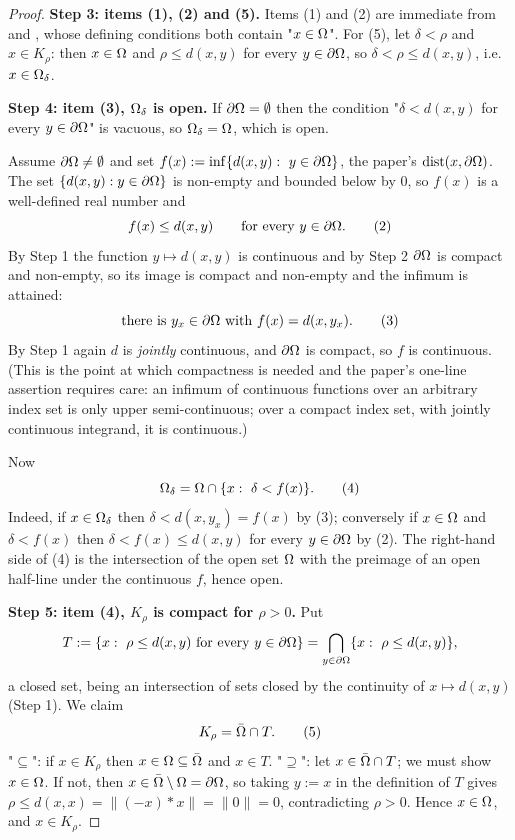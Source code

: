 \begin{proof}
\medskip\noindent\textbf{Step 3: items (1), (2) and (5).} Items (1) and (2) are immediate
from  and , whose defining conditions both
contain "$x\in\Omega$". For (5), let $\delta<\rho$ and $x\in K_\rho$: then $x\in\Omega$ and
$\rho\le d(x,y)$ for every $y\in\partial\Omega$, so $\delta<\rho\le d(x,y)$, i.e. $x\in\Omega_\delta$.

\medskip\noindent\textbf{Step 4: item (3), $\Omega_\delta$ is open.} If $\partial\Omega=\emptyset$
then the condition "$\delta<d(x,y)$ for every $y\in\partial\Omega$" is vacuous, so
$\Omega_\delta=\Omega$, which is open.

Assume $\partial\Omega\ne\emptyset$ and set
$f(x):=\inf\{d(x,y):\ y\in\partial\Omega\}$, the paper's $\operatorname{dist}(x,\partial\Omega)$. The set
$\{d(x,y):y\in\partial\Omega\}$ is non-empty and bounded below by $0$, so $f(x)$ is a well-defined
real number and
\[
 f(x)\le d(x,y)\qquad\text{for every }y\in\partial\Omega . \tag{2}
\]
By Step 1 the function $y\mapsto d(x,y)$ is continuous and by Step 2 $\partial\Omega$ is compact
and non-empty, so its image is compact and non-empty and the infimum is attained:
\[
 \text{there is }y_x\in\partial\Omega\text{ with } f(x)=d(x,y_x). \tag{3}
\]
By Step 1 again $d$ is \emph{jointly} continuous, and $\partial\Omega$ is compact, so $f$ is
continuous. (This is the point at which compactness is needed and the paper's one-line
assertion requires care: an infimum of continuous functions over an arbitrary index set is
only upper semi-continuous; over a compact index set, with jointly continuous integrand, it
is continuous.)

Now
\[
 \Om_\delta=\Om\cap\{x:\ \delta<f(x)\} . \tag{4}
\]
Indeed, if $x\in\Omega_\delta$ then $\delta<d(x,y_x)=f(x)$ by (3); conversely if $x\in\Omega$ and
$\delta<f(x)$ then $\delta<f(x)\le d(x,y)$ for every $y\in\partial\Omega$ by (2). The right-hand
side of (4) is the intersection of the open set $\Omega$ with the preimage of an open half-line
under the continuous $f$, hence open.

\medskip\noindent\textbf{Step 5: item (4), $K_\rho$ is compact for $\rho>0$.} Put
\[
 T:=\{x:\ \rho\le d(x,y)\ \text{for every}\ y\in\partial\Omega\}=\bigcap_{y\in\partial\Omega}\{x:\ \rho\le d(x,y)\},
\]
a closed set, being an intersection of sets closed by the continuity of $x\mapsto d(x,y)$
(Step 1). We claim
\[
 K_\rho=\bar{\Omega}\cap T. \tag{5}
\]
"$\subseteq$": if $x\in K_\rho$ then $x\in\Omega\subseteq\bar{\Omega}$ and $x\in T$. "$\supseteq$":
let $x\in\bar{\Omega}\cap T$; we must show $x\in\Omega$. If not, then $x\in\bar{\Omega}\setminus\Omega=\partial\Omega$,
so taking $y:=x$ in the definition of $T$ gives $\rho\le d(x,x)=\|(-x)*x\|=\|0\|=0$,
contradicting $\rho>0$. Hence $x\in\Omega$, and $x\in K_\rho$.


\end{proof}
